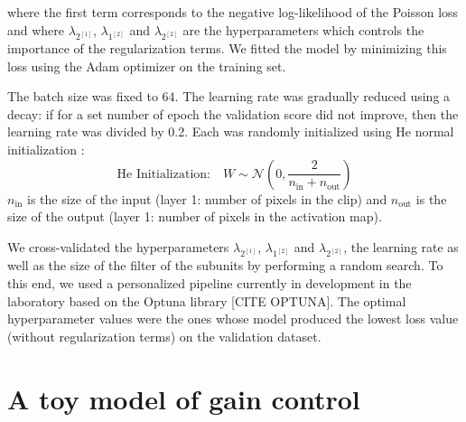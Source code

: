 where the first term corresponds to the negative
log-likelihood of the Poisson loss and where $\lambda_{2^{[1]}} $,
$\lambda_{1^{[2]}}$ and $\lambda_{2^{[2]}}$ are the hyperparameters
which controls the importance of the regularization terms. We
fitted the model by minimizing this loss using the Adam optimizer on the
training set.

The batch size was fixed to 64.
The learning rate was gradually reduced using a decay: if for a set number of
epoch the validation score did not improve, then the learning rate was divided
by 0.2.
Each was randomly initialized using He normal initialization :
\[
    \text{He Initialization:} \quad W \sim \mathcal{N}\left(0,
    \frac{2}{n_{\text{in}} + n_{\text{out}}}\right)
\]
$n_{\text{in}}$ is the size of the input (layer 1: number of pixels in the
clip) and $n_{\text{out}}$ is the size of the output (layer 1: number of pixels
in the
activation map).

We cross-validated the hyperparameters $\lambda_{2^{[1]}} $,
$\lambda_{1^{[2]}}$ and $\lambda_{2^{[2]}}$, the learning rate as well as the
size of the filter of the subunits
by performing a random search. To this end, we used a personalized pipeline
currently in development in the laboratory based on the Optuna library \cite{}
[CITE OPTUNA]. The optimal hyperparameter values were the ones
whose model produced the lowest loss value (without regularization terms) on
the validation dataset.

\section{A toy model of gain control}\label{app:toyModel}

